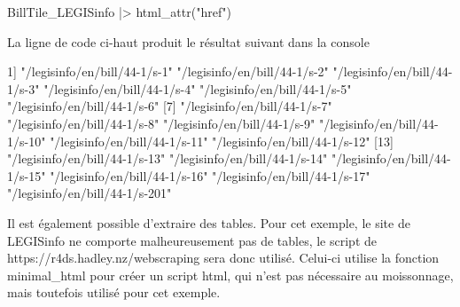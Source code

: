 \documentclass[
  letterpaper,
  DIV=11,
  numbers=noendperiod]{scrreprt}
\newenvironment{Shaded}{\begin{snugshade}}{\end{snugshade}}
\newcommand{\ExtensionTok}[1]{\textcolor[rgb]{0.00,0.23,0.31}{#1}}
\newcommand{\KeywordTok}[1]{\textcolor[rgb]{0.00,0.23,0.31}{#1}}
\newcommand{\NormalTok}[1]{\textcolor[rgb]{0.00,0.23,0.31}{#1}}
\newcommand{\OperatorTok}[1]{\textcolor[rgb]{0.37,0.37,0.37}{#1}}
\newcommand{\StringTok}[1]{\textcolor[rgb]{0.13,0.47,0.30}{#1}}
\begin{document}
\begin{Shaded}
\begin{Highlighting}[]
\ExtensionTok{BillTile\_LEGISinfo} \KeywordTok{|}\OperatorTok{\textgreater{}}\NormalTok{ html\_attr}\KeywordTok{(}\StringTok{"href"}\KeywordTok{)}
\end{Highlighting}
\end{Shaded}

La ligne de code ci-haut produit le résultat suivant dans la console

\begin{Shaded}
\begin{Highlighting}[]
\ExtensionTok{1]} \StringTok{"/legisinfo/en/bill/44{-}1/s{-}1"}   \StringTok{"/legisinfo/en/bill/44{-}1/s{-}2"}   \StringTok{"/legisinfo/en/bill/44{-}1/s{-}3"}   \StringTok{"/legisinfo/en/bill/44{-}1/s{-}4"}   \StringTok{"/legisinfo/en/bill/44{-}1/s{-}5"}   \StringTok{"/legisinfo/en/bill/44{-}1/s{-}6"}  
 \ExtensionTok{[7]} \StringTok{"/legisinfo/en/bill/44{-}1/s{-}7"}   \StringTok{"/legisinfo/en/bill/44{-}1/s{-}8"}   \StringTok{"/legisinfo/en/bill/44{-}1/s{-}9"}   \StringTok{"/legisinfo/en/bill/44{-}1/s{-}10"}  \StringTok{"/legisinfo/en/bill/44{-}1/s{-}11"}  \StringTok{"/legisinfo/en/bill/44{-}1/s{-}12"} 
\ExtensionTok{[13]} \StringTok{"/legisinfo/en/bill/44{-}1/s{-}13"}  \StringTok{"/legisinfo/en/bill/44{-}1/s{-}14"}  \StringTok{"/legisinfo/en/bill/44{-}1/s{-}15"}  \StringTok{"/legisinfo/en/bill/44{-}1/s{-}16"}  \StringTok{"/legisinfo/en/bill/44{-}1/s{-}17"}  \StringTok{"/legisinfo/en/bill/44{-}1/s{-}201"}
\end{Highlighting}
\end{Shaded}

Il est également possible d'extraire des tables. Pour cet exemple, le
site de LEGISinfo ne comporte malheureusement pas de tables, le script
de https://r4ds.hadley.nz/webscraping sera donc utilisé. Celui-ci
utilise la fonction minimal\_html pour créer un script html, qui n'est
pas nécessaire au moissonnage, mais toutefois utilisé pour cet exemple.
\end{document}

